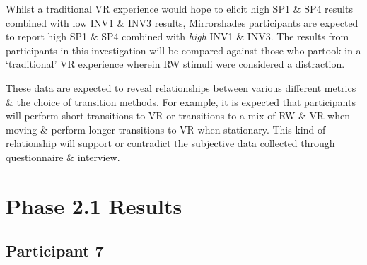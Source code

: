 
Whilst a traditional VR experience would hope to elicit high SP1 \& SP4 results combined with low INV1 \& INV3 results, Mirrorshades participants are expected to report high SP1 \& SP4 combined with \textit{high} INV1 \& INV3. The results from participants in this investigation will be compared against those who partook in a `traditional' VR experience wherein RW stimuli were considered a distraction.







These data are expected to reveal relationships between various different metrics \& the choice of transition methods. For example, it is expected that participants will perform short transitions to VR or transitions to a mix of RW \& VR when moving \& perform longer transitions to VR when stationary. This kind of relationship will support or contradict the subjective data collected through questionnaire \& interview.

\section{Phase 2.1 Results}


\clearpage

\subsection{Participant 7}


